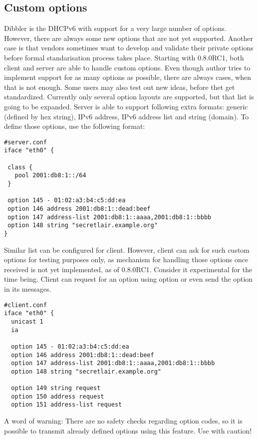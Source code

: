 \subsection{Custom options}
\label{feature-custom-options}
Dibbler is the DHCPv6 with support for a very large number of
options. However, there are always some new options that are not yet
supported. Another case is that vendors sometimes want to develop
and validate their private options before formal standarisation
process takes place. Starting with 0.8.0RC1, both client and server
are able to handle custom options. Even though author tries to
implement support for as many options as possible, there are always
cases, when that is not
enough. Some users may also test out new ideas, before thet get
standardized. Currently only several option layouts are supported, but
that list is going to be expanded. Server is able to support
following extra formats: generic (defined by hex string), IPv6
address, IPv6 address list and string (domain). To define those
options, use the following format:

\begin{lstlisting}
#server.conf
iface "eth0" {

 class {
   pool 2001:db8:1::/64
 }

 option 145 - 01:02:a3:b4:c5:dd:ea
 option 146 address 2001:db8:1::dead:beef
 option 147 address-list 2001:db8:1::aaaa,2001:db8:1::bbbb
 option 148 string "secretlair.example.org"
}
\end{lstlisting}

Similar list can be configured for client. However, client can ask
for such custom options for testing purposes only, as mechanism for
handling those options once received is not yet implemented, as of
0.8.0RC1. Consider it experimental for the time being. Client can
request for an option using  option or even send the option
in its messages.

\begin{lstlisting}
#client.conf
iface "eth0" {
  unicast 1
  ia

  option 145 - 01:02:a3:b4:c5:dd:ea
  option 146 address 2001:db8:1::dead:beef
  option 147 address-list 2001:db8:1::aaaa,2001:db8:1::bbbb
  option 148 string "secretlair.example.org"

  option 149 string request
  option 150 address request
  option 151 address-list request
\end{lstlisting}

A word of warning: There are no safety checks regarding option codes,
so it is possible to transmit already defined options using this
feature. Use with caution!

